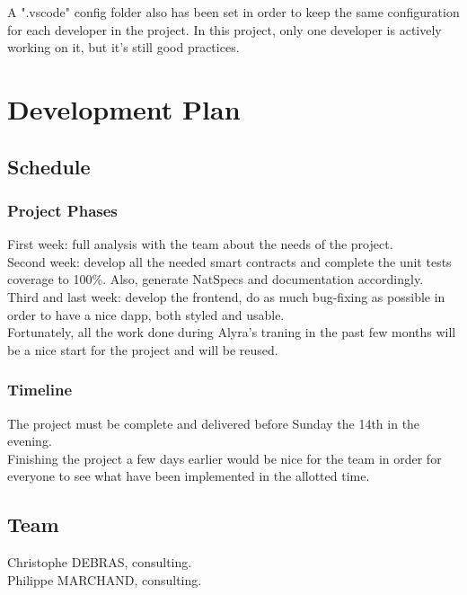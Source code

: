 \documentclass[a4paper, 12pt]{article}
\begin{document}
A ".vscode" config folder also has been set in order to keep the same configuration for each developer in the project. In this project, only one developer is actively working on it, but it's still good practices.

\section{Development Plan}

\subsection{Schedule}
\subsubsection{Project Phases}

First week: full analysis with the team about the needs of the project.\\

Second week: develop all the needed smart contracts and complete the unit tests coverage to 100\%. Also, generate NatSpecs and documentation accordingly.\\

Third and last week: develop the frontend, do as much bug-fixing as possible in order to have a nice dapp, both styled and usable.\\

Fortunately, all the work done during Alyra's traning in the past few months will be a nice start for the project and will be reused.

\subsubsection{Timeline}

The project must be complete and delivered before Sunday the 14th in the evening.\\

Finishing the project a few days earlier would be nice for the team in order for everyone to see what have been implemented in the allotted time.

\subsection{Team}

Christophe DEBRAS, consulting.\\

Philippe MARCHAND, consulting.\\
\end{document}
